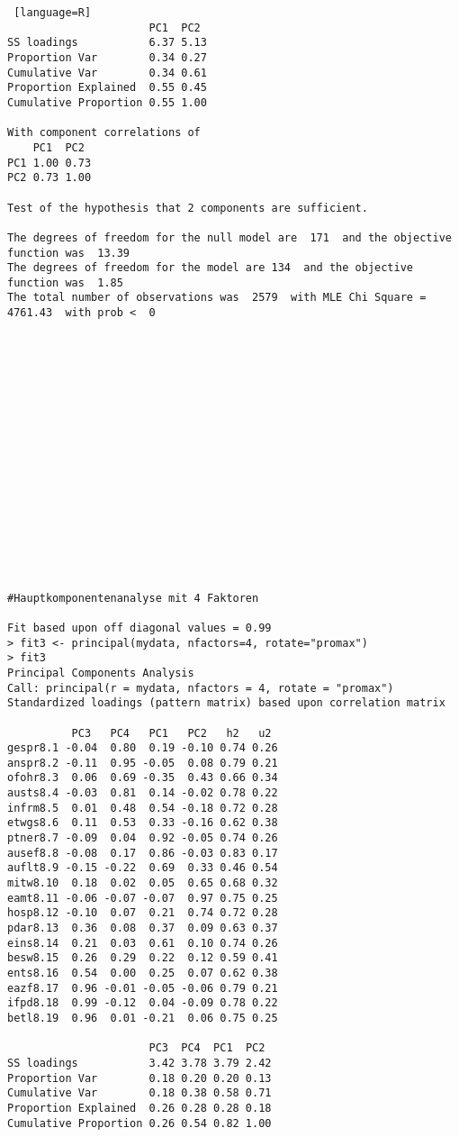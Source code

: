 \begin{lstlisting} [language=R]
                      PC1  PC2
SS loadings           6.37 5.13
Proportion Var        0.34 0.27
Cumulative Var        0.34 0.61
Proportion Explained  0.55 0.45
Cumulative Proportion 0.55 1.00

With component correlations of 
    PC1  PC2
PC1 1.00 0.73
PC2 0.73 1.00

Test of the hypothesis that 2 components are sufficient.

The degrees of freedom for the null model are  171  and the objective function was  13.39
The degrees of freedom for the model are 134  and the objective function was  1.85 
The total number of observations was  2579  with MLE Chi Square =  4761.43  with prob <  0 


















#Hauptkomponentenanalyse mit 4 Faktoren

Fit based upon off diagonal values = 0.99
> fit3 <- principal(mydata, nfactors=4, rotate="promax")
> fit3
Principal Components Analysis
Call: principal(r = mydata, nfactors = 4, rotate = "promax")
Standardized loadings (pattern matrix) based upon correlation matrix

          PC3   PC4   PC1   PC2   h2   u2
gespr8.1 -0.04  0.80  0.19 -0.10 0.74 0.26
anspr8.2 -0.11  0.95 -0.05  0.08 0.79 0.21
ofohr8.3  0.06  0.69 -0.35  0.43 0.66 0.34
austs8.4 -0.03  0.81  0.14 -0.02 0.78 0.22
infrm8.5  0.01  0.48  0.54 -0.18 0.72 0.28
etwgs8.6  0.11  0.53  0.33 -0.16 0.62 0.38
ptner8.7 -0.09  0.04  0.92 -0.05 0.74 0.26
ausef8.8 -0.08  0.17  0.86 -0.03 0.83 0.17
auflt8.9 -0.15 -0.22  0.69  0.33 0.46 0.54
mitw8.10  0.18  0.02  0.05  0.65 0.68 0.32
eamt8.11 -0.06 -0.07 -0.07  0.97 0.75 0.25
hosp8.12 -0.10  0.07  0.21  0.74 0.72 0.28
pdar8.13  0.36  0.08  0.37  0.09 0.63 0.37
eins8.14  0.21  0.03  0.61  0.10 0.74 0.26
besw8.15  0.26  0.29  0.22  0.12 0.59 0.41
ents8.16  0.54  0.00  0.25  0.07 0.62 0.38
eazf8.17  0.96 -0.01 -0.05 -0.06 0.79 0.21
ifpd8.18  0.99 -0.12  0.04 -0.09 0.78 0.22
betl8.19  0.96  0.01 -0.21  0.06 0.75 0.25

                      PC3  PC4  PC1  PC2
SS loadings           3.42 3.78 3.79 2.42
Proportion Var        0.18 0.20 0.20 0.13
Cumulative Var        0.18 0.38 0.58 0.71
Proportion Explained  0.26 0.28 0.28 0.18
Cumulative Proportion 0.26 0.54 0.82 1.00


\end{lstlisting}
